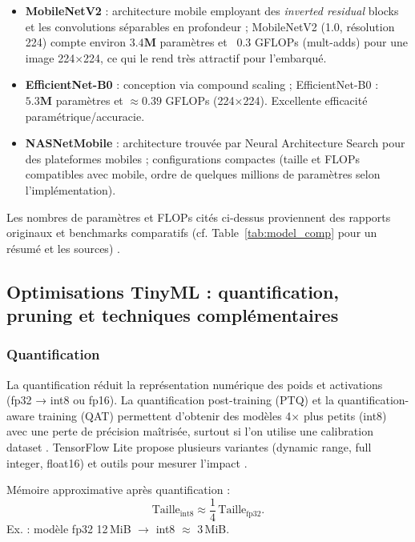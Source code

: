 \begin{itemize}
  \item \textbf{MobileNetV2} \parencite{Sandler2018mobilenetv2} : architecture mobile employant des \emph{inverted residual} blocks et les convolutions séparables en profondeur ; MobileNetV2 (1.0, résolution 224) compte environ \(\mathbf{3.4M}\) paramètres et ~\(\mathbf{0.3}\) GFLOPs (mult-adds) pour une image 224×224, ce qui le rend très attractif pour l'embarqué.
  \item \textbf{EfficientNet-B0} \autocite{tan2019efficientnet} : conception via compound scaling ; EfficientNet-B0 : ~\(\mathbf{5.3M}\) paramètres et \(\approx\mathbf{0.39}\) GFLOPs (224×224). Excellente efficacité paramétrique/accuracie.
  \item \textbf{NASNetMobile} \autocite{zoph2018nasnet} : architecture trouvée par Neural Architecture Search pour des plateformes mobiles ; configurations compactes (taille et FLOPs compatibles avec mobile, ordre de quelques millions de paramètres selon l'implémentation).
\end{itemize}

Les nombres de paramètres et FLOPs cités ci-dessus proviennent des rapports originaux et benchmarks comparatifs (cf. Table~\ref{tab:model_comp} pour un résumé et les sources) \autocite{tan2019efficientnet,sandler2018mobilenetv2,zoph2018nasnet}.

\subsection{Optimisations TinyML : quantification, pruning et techniques complémentaires}

\subsubsection{Quantification}

La quantification réduit la représentation numérique des poids et activations (fp32 → int8 ou fp16). La quantification post-training (PTQ) et la quantification-aware training (QAT) permettent d’obtenir des modèles 4× plus petits (int8) avec une perte de précision maîtrisée, surtout si l’on utilise une calibration dataset \autocite{jacob2018quantization,tensorflowlitequant}. TensorFlow Lite propose plusieurs variantes (dynamic range, full integer, float16) et outils pour mesurer l'impact \autocite{tensorflowlitequant}. 

Mémoire approximative après quantification :
\[
\text{Taille}_{\text{int8}} \approx \frac{1}{4}\,\text{Taille}_{\text{fp32}}.
\]
Ex. : modèle fp32 12\,MiB \(\rightarrow\) int8 \(\approx\) 3\,MiB.

